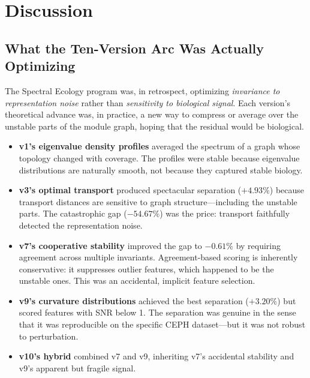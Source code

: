 \documentclass{../yalumba}
\begin{document}
\section{Discussion}
\label{sec:discussion}

\subsection{What the Ten-Version Arc Was Actually Optimizing}
\label{sec:actually-optimizing}

The Spectral Ecology program was, in retrospect, optimizing
\emph{invariance to representation noise} rather than \emph{sensitivity
to biological signal}.  Each version's theoretical advance was, in
practice, a new way to compress or average over the unstable parts of
the module graph, hoping that the residual would be biological.

\begin{itemize}
  \item \textbf{v1's eigenvalue density profiles} averaged the spectrum
    of a graph whose topology changed with coverage.  The profiles were
    stable because eigenvalue distributions are naturally smooth, not
    because they captured stable biology.
  \item \textbf{v3's optimal transport} produced spectacular separation
    ($+4.93\%$) because transport distances are sensitive to graph
    structure---including the unstable parts.  The catastrophic gap
    ($-54.67\%$) was the price: transport faithfully detected the
    representation noise.
  \item \textbf{v7's cooperative stability} improved the gap to
    $-0.61\%$ by requiring agreement across multiple invariants.
    Agreement-based scoring is inherently conservative: it suppresses
    outlier features, which happened to be the unstable ones.  This was
    an accidental, implicit feature selection.
  \item \textbf{v9's curvature distributions} achieved the best
    separation ($+3.20\%$) but scored features with SNR below 1.  The
    separation was genuine in the sense that it was reproducible on the
    specific CEPH dataset---but it was not robust to perturbation.
  \item \textbf{v10's hybrid} combined v7 and v9, inheriting v7's
    accidental stability and v9's apparent but fragile signal.
\end{itemize}
\end{document}
